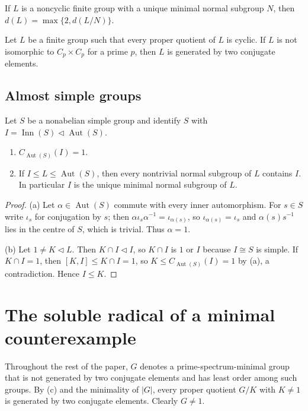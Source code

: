 \documentclass[11pt,colorlinks]{charlie}
\DeclareMathOperator{\Aut}{Aut}
\DeclareMathOperator{\Inn}{Inn}
\begin{document}
\begin{theorem}\label{thm:lm}
If $L$ is a noncyclic finite group with a unique minimal normal subgroup $N$, then $d(L)=\max\{2,d(L/N)\}$.
\end{theorem}

\begin{theorem}\label{thm:bgh}
Let $L$ be a finite group such that every proper quotient of $L$ is cyclic. If $L$ is not isomorphic to $C_p\times C_p$ for a prime $p$, then $L$ is generated by two conjugate elements.
\end{theorem}

\subsection{Almost simple groups}
Let $S$ be a nonabelian simple group and identify $S$ with $I=\Inn(S)\lhd\Aut(S)$.

\begin{lemma}\label{lem:centralizer}
\begin{enumerate}
\item $C_{\Aut(S)}(I)=1$.
\item If $I\le L\le\Aut(S)$, then every nontrivial normal subgroup of $L$ contains $I$. In particular $I$ is the unique minimal normal subgroup of $L$.
\end{enumerate}
\end{lemma}

\begin{proof}
(a) Let $\alpha\in\Aut(S)$ commute with every inner automorphism. For $s\in S$ write $\iota_s$ for conjugation by $s$; then $\alpha\iota_s\alpha^{-1}=\iota_{\alpha(s)}$, so $\iota_{\alpha(s)}=\iota_s$ and $\alpha(s)s^{-1}$ lies in the centre of $S$, which is trivial. Thus $\alpha=1$.

(b) Let $1\ne K\lhd L$. Then $K\cap I\lhd I$, so $K\cap I$ is $1$ or $I$ because $I\cong S$ is simple. If $K\cap I=1$, then $[K,I]\le K\cap I=1$, so $K\le C_{\Aut(S)}(I)=1$ by (a), a contradiction. Hence $I\le K$.
\end{proof}

\section{The soluble radical of a minimal counterexample}\label{sec:radical}

Throughout the rest of the paper, $G$ denotes a prime-spectrum-minimal group that is not generated by two conjugate elements and has least order among such groups. By (c) and the minimality of $|G|$, every proper quotient $G/K$ with $K\ne1$ is generated by two conjugate elements. Clearly $G\ne1$.
\end{document}
